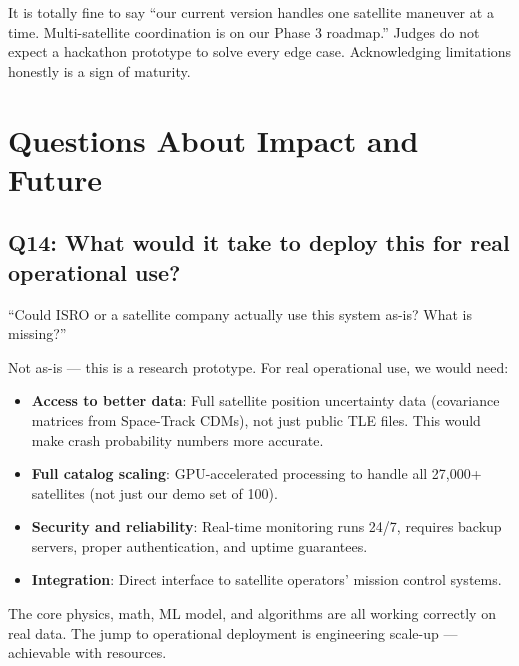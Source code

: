 \documentclass[11pt,a4paper]{article}
\begin{document}
\begin{tipbox}
It is totally fine to say ``our current version handles one satellite maneuver at a time. Multi-satellite coordination is on our Phase 3 roadmap.'' Judges do not expect a hackathon prototype to solve every edge case. Acknowledging limitations honestly is a sign of maturity.
\end{tipbox}

\newpage
\section{Questions About Impact and Future}

\subsection*{Q14: What would it take to deploy this for real operational use?}

\begin{questionbox}
``Could ISRO or a satellite company actually use this system as-is? What is missing?''
\end{questionbox}

\begin{answerbox}
Not as-is --- this is a research prototype. For real operational use, we would need:
\begin{itemize}
    \item \textbf{Access to better data}: Full satellite position uncertainty data (covariance matrices from Space-Track CDMs), not just public TLE files. This would make crash probability numbers more accurate.
    \item \textbf{Full catalog scaling}: GPU-accelerated processing to handle all 27,000+ satellites (not just our demo set of 100).
    \item \textbf{Security and reliability}: Real-time monitoring runs 24/7, requires backup servers, proper authentication, and uptime guarantees.
    \item \textbf{Integration}: Direct interface to satellite operators' mission control systems.
\end{itemize}
The core physics, math, ML model, and algorithms are all working correctly on real data. The jump to operational deployment is engineering scale-up --- achievable with resources.
\end{answerbox}
\end{document}
